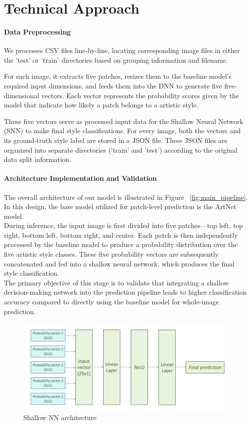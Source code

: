 \section{Technical Approach}
\label{sec:method}
\paragraph{Data Preprocessing}
We processes CSV files line-by-line, locating corresponding image files in
either the 'test' or 'train' directories based on grouping information and
filename.

For each image, it extracts five patches, resizes them to the baseline model's
required input dimensions, and feeds them into the DNN to generate five
five-dimensional vectors. Each vector represents the probability scores given
by the model that indicate how likely a patch belongs to a artistic style.

These five vectors serve as processed input data for the Shallow Neural Network
(SNN) to make final style classifications. For every image, both the vectors
and its ground-truth style label are stored in a JSON file. These JSON files
are organized into separate directories ('train' and 'test') according to the
original data split information.
\paragraph{Architecture Implementation and Validation}
The overall architecture of our model is illustrated in Figure ~\ref{fig:main_pipeline}. In this
design, the base model utilized for patch-level prediction is the ArtNet
model.\\ During inference, the input image is first divided into five
patches—top left, top right, bottom left, bottom right, and center. Each patch
is then independently processed by the baseline model to produce a probability
distribution over the five artistic style classes. These five probability
vectors are subsequently concatenated and fed into a shallow neural network,
which produces the final style classification.\\ The primary objective of this
stage is to validate that integrating a shallow decision-making network into
the prediction pipeline leads to higher classification accuracy compared to
directly using the baseline model for whole-image prediction.
\begin{figure}[h]

    \centering
    \includegraphics[width=.45\textwidth]{shallownn.png}
    \caption{Shallow NN architecture}
    \label{fig:shallow_nn}
\end{figure}

